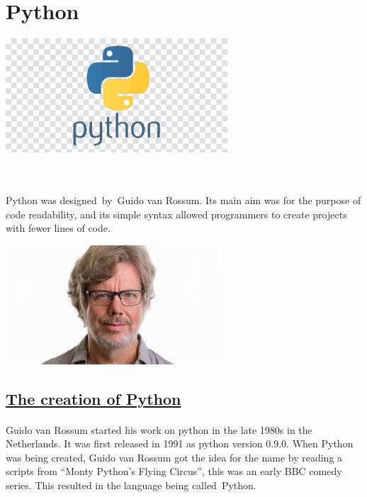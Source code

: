 \documentclass[[12pt]{article}
\begin{document}
	\newpage
	\section* {\Huge{Python}}	
				\includegraphics[width= 0.1\linewidth]{pics/Plogo.png} \raggedright\\
		\begin{minipage}{0.59\linewidth}		
			\paragraph{}
			\large Python was designed by Guido van Rossum. Its main aim was for the purpose of code readability, and its simple syntax allowed programmers to create projects with fewer lines of code.	
		\end{minipage}
		\begin{minipage}{0.39\linewidth}
			\includegraphics[width= \linewidth]{pics/Pimage.jpg}
		\end{minipage}
		\subsection*{\Large \underline{The creation of Python}}
	\paragraph{}			
		Guido van Rossum started his work on python in the late 1980s in the Netherlands. It was first released in 1991 as python version 0.9.0. When Python was being created, Guido van Rossum got the idea for the name by reading a scripts from “Monty Python's Flying Circus”, this was an early BBC comedy series. This resulted in the language being called Python.\\
		
\end{document}
